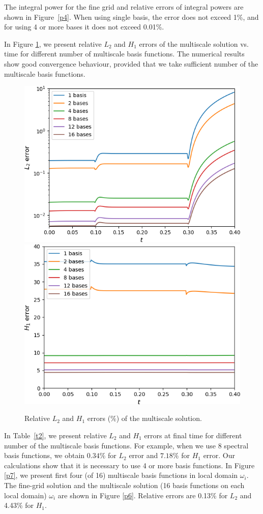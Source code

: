 \documentclass[runningheads]{llncs}
\begin{document}
The integral power for the fine grid and relative errors of integral powers are shown in Figure~\ref{p4}. 
When using single basis, the error does not exceed 1\%, and for using 4 or more bases it does not exceed 0.01\%.

In Figure \ref{p5}, we present relative $L_2$ and $H_1$ errors of the multiscale solution vs. time for different number of multiscale basis functions.
The numerical results show good convergence behaviour, provided that we take sufficient number of the multiscale basis functions.

\begin{figure}[h!]
\centering
\includegraphics[width=0.45\linewidth]{L2_log.png} 
\hspace{2em}
\includegraphics[width=0.45\linewidth]{H1.png} 
\caption{Relative $L_2$ and $H_1$ errors ($\%$) of the multiscale solution.}
\label{p5}
\end{figure} 

In Table~\ref{t2}, we present relative $L_2$ and $H_1$ errors at final time for different number of the multiscale basis functions.
For example, when we use 8 spectral basis functions, we obtain $0.34\%$ for $L_2$ error and $7.18\%$ for $H_1$ error. 
Our calculations show that it is necessary to use 4 or more basis functions. 
In Figure \ref{p7}, we present first four (of 16) multiscale basis functions in local domain $\omega_i$.
The fine-grid solution and the multiscale solution (16 basis functions on each local domain) $\omega_i$ are shown in Figure \ref{p6}. Relative errors are 0.13\% for $L_2$ and 4.43\% for $H_1$. 
\end{document}
